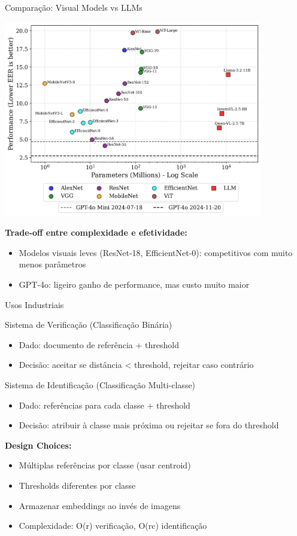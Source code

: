 \begin{frame}{Comparação: Visual Models vs LLMs}
\begin{center}
\includegraphics[width=0.85\textwidth]{images/performance_vs_parameters.png}
\end{center}

\textbf{Trade-off entre complexidade e efetividade:}
\begin{itemize}
    \item Modelos visuais leves (ResNet-18, EfficientNet-0): competitivos com muito menos parâmetros
    \item GPT-4o: ligeiro ganho de performance, mas custo muito maior
\end{itemize}
\end{frame}

\begin{frame}{Usos Industriais}
\begin{block}{Sistema de Verificação (Classificação Binária)}
\begin{itemize}
    \item Dado: documento de referência + threshold
    \item Decisão: aceitar se distância < threshold, rejeitar caso contrário
\end{itemize}
\end{block}

\begin{block}{Sistema de Identificação (Classificação Multi-classe)}
\begin{itemize}
    \item Dado: referências para cada classe + threshold
    \item Decisão: atribuir à classe mais próxima ou rejeitar se fora do threshold
\end{itemize}
\end{block}

\textbf{Design Choices:}
\begin{itemize}
    \item Múltiplas referências por classe (usar centroid)
    \item Thresholds diferentes por classe
    \item Armazenar embeddings ao invés de imagens
    \item Complexidade: O(r) verificação, O(rc) identificação
\end{itemize}
\end{frame}
